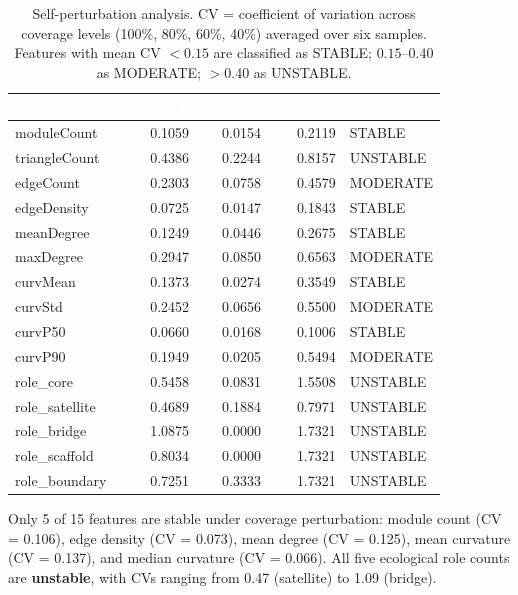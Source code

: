 \documentclass{../yalumba}
\begin{document}
\begin{table}[htbp]
\centering
\tablestyle
\caption{Self-perturbation analysis.  CV = coefficient of variation
across coverage levels (100\%, 80\%, 60\%, 40\%) averaged over six
samples.  Features with mean CV $< 0.15$ are classified as STABLE;
$0.15$--$0.40$ as MODERATE; $> 0.40$ as UNSTABLE.}
\label{tab:self-perturbation}
\begin{tabular}{@{}lrrrl@{}}
\toprule
\rowcolor{table-header}
\textcolor{white}{\textbf{Feature}} &
\textcolor{white}{\textbf{Mean CV}} &
\textcolor{white}{\textbf{Min CV}} &
\textcolor{white}{\textbf{Max CV}} &
\textcolor{white}{\textbf{Verdict}} \\
\midrule
moduleCount    & 0.1059 & 0.0154 & 0.2119 & STABLE \\
triangleCount  & 0.4386 & 0.2244 & 0.8157 & UNSTABLE \\
edgeCount      & 0.2303 & 0.0758 & 0.4579 & MODERATE \\
edgeDensity    & 0.0725 & 0.0147 & 0.1843 & STABLE \\
meanDegree     & 0.1249 & 0.0446 & 0.2675 & STABLE \\
maxDegree      & 0.2947 & 0.0850 & 0.6563 & MODERATE \\
curvMean       & 0.1373 & 0.0274 & 0.3549 & STABLE \\
curvStd        & 0.2452 & 0.0656 & 0.5500 & MODERATE \\
curvP50        & 0.0660 & 0.0168 & 0.1006 & STABLE \\
curvP90        & 0.1949 & 0.0205 & 0.5494 & MODERATE \\
role\_core      & 0.5458 & 0.0831 & 1.5508 & UNSTABLE \\
role\_satellite & 0.4689 & 0.1884 & 0.7971 & UNSTABLE \\
role\_bridge    & 1.0875 & 0.0000 & 1.7321 & UNSTABLE \\
role\_scaffold  & 0.8034 & 0.0000 & 1.7321 & UNSTABLE \\
role\_boundary  & 0.7251 & 0.3333 & 1.7321 & UNSTABLE \\
\bottomrule
\end{tabular}
\end{table}

\begin{keyfinding}
Only 5 of 15 features are stable under coverage perturbation: module
count (CV = 0.106), edge density (CV = 0.073), mean degree (CV = 0.125),
mean curvature (CV = 0.137), and median curvature (CV = 0.066).  All
five ecological role counts are \textbf{unstable}, with CVs ranging from
0.47 (satellite) to 1.09 (bridge).
\end{keyfinding}
\end{document}
